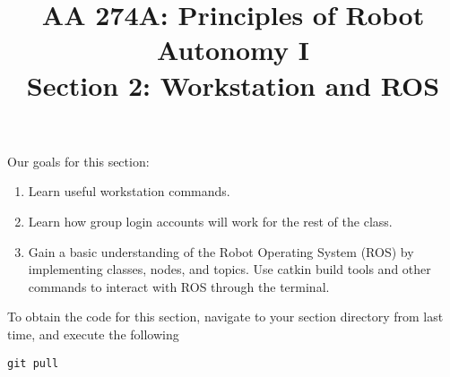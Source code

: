 \documentclass{article}
\title{AA 274A: Principles of Robot Autonomy I \\ Section 2: Workstation and ROS}
\date{}
\begin{document}
\maketitle
\pagestyle{fancy}

Our goals for this section:
\begin{enumerate}
    \item Learn useful workstation commands.
    \item Learn how group login accounts will work for the rest of the class. 
    \item Gain a basic understanding of the Robot Operating System (ROS) by implementing classes, nodes, and topics. Use catkin build tools and other commands to interact with ROS through the terminal.
\end{enumerate}


To obtain the code for this section, navigate to your section directory from last time, and execute the following

\begin{lstlisting}
git pull
\end{lstlisting}




\end{document}
